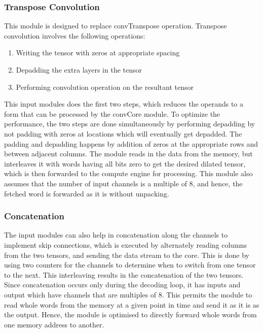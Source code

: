 \documentclass[a4paper,12pt, final]{report}
\begin{document}
\subsubsection{Transpose Convolution}

This module is designed to replace convTranspose operation. Transpose convolution involves the following operations:
\begin{enumerate}
    \item Writing the tensor with zeros at appropriate spacing
    \item Depadding the extra layers in the tensor
    \item Performing convolution operation on the resultant tensor
\end{enumerate}

This input modules does the first two steps, which reduces the operands to a form that can be processed by the convCore module. To optimize the performance, the two steps are done simultaneously by performing depadding by not padding with zeros at locations which will eventually get depadded. The padding and depadding happens by addition of zeros at the appropriate rows and between adjacent columns. The module reads in the data from the memory, but interleaves it with words having all bits zero to get the desired dilated tensor, which is then forwarded to the compute engine for processing. This module also assumes that the number of input channels is a multiple of 8, and hence, the fetched word is forwarded as it is without unpacking.

\subsubsection{Concatenation}

The input modules can also help in concatenation along the channels to implement skip connections, which is executed by alternately reading columns from the two tensors, and sending the data stream to the core. This is done by using two counters for the channels to determine when to switch from one tensor to the next. This interleaving results in the concatenation of the two tensors.
\\

Since concatenation occurs only during the decoding loop, it has inputs and output which have channels that are multiples of 8. This permits the module to read whole words from the memory at a given point in time and send it as it is as the output. Hence, the module is optimised to directly forward whole words from one memory address to another.
\end{document}

